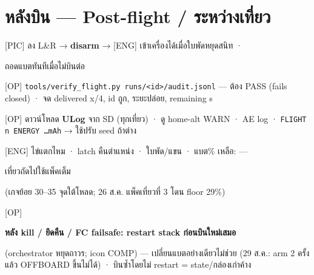 \documentclass[11pt,a4paper]{article}
\newcommand{\code}[1]{\texttt{\small #1}}
\newcommand{\hl}[1]{\colorbox{hlyel}{\strut #1}}
\newcommand{\hlr}[1]{\colorbox{hlred}{\strut\color{stopred}\bfseries #1}}
\newcommand{\who}[1]{{\small\color{blu}[#1]}}
\begin{document}
\section{หลังบิน — Post-flight / ระหว่างเที่ยว}
\begin{cl}
\item \who{PIC} ลง L\&R → \textbf{disarm} → \who{ENG} เข้าเครื่องได้เมื่อใบพัดหยุดสนิท · \hl{ถอดแบตทันทีเมื่อไม่บินต่อ}
\item \who{OP} \code{tools/verify_flight.py runs/<id>/audit.jsonl} — ต้อง PASS (fails closed) · จด delivered x/4, id ถูก, ระยะปล่อย, remaining s
\item \who{OP} ดาวน์โหลด \textbf{ULog} จาก SD (ทุกเที่ยว) · ดู home-alt WARN · AE log · \code{FLIGHT n ENERGY …mAh} → ใช้ปรับ seed ถ้าต่าง
\item \who{ENG} ไข่แตกไหม · latch คืนตำแหน่ง · ใบพัด/แขน · แบต\% เหลือ: \underline{\hspace{1.2cm}} — \hl{เที่ยวถัดไปใช้แพ็คเต็ม} (เกจย้อย 30–35 จุดใต้โหลด; 26 ส.ค. แพ็คเที่ยวที่ 3 โดน floor 29\%)
\item \who{OP} \hlr{หลัง kill / ยึดคืน / FC failsafe: restart stack ก่อนบินใหม่เสมอ} (orchestrator หยุดถาวร; icon COMP) — เปลี่ยนแบตอย่างเดียวไม่ช่วย (29 ส.ค.: arm 2 ครั้งแล้ว OFFBOARD ขึ้นไม่ได้) · บินซ้ำโดยไม่ restart = state/กล่องเก่าค้าง
\end{cl}

\end{document}

